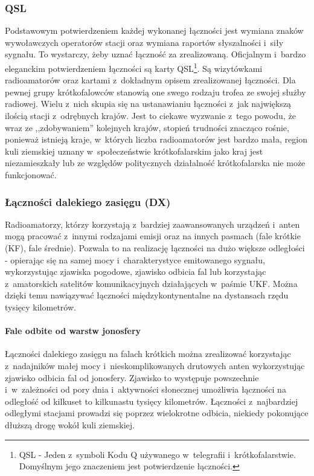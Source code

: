 \documentclass[eng,oneside]{mgr}
\begin{document}
				\subsubsection{QSL}
				Podstawowym potwierdzeniem każdej wykonanej łączności jest wymiana znaków wywoławczych operatorów stacji oraz wymiana raportów słyszalności i~siły sygnału. To wystarczy, żeby uznać łączność za zrealizowaną. Oficjalnym i~bardzo eleganckim potwierdzeniem łączności są karty QSL\footnote{QSL - Jeden z~symboli Kodu Q używanego w~telegrafii i~krótkofalarstwie. Domyślnym jego znaczeniem jest potwierdzenie łączności.}. Są wizytówkami radioamatorów oraz kartami z~dokładnym opisem zrealizowanej łączności. Dla pewnej grupy krótkofalowców stanowią one swego rodzaju trofea ze swojej służby radiowej. Wielu z~nich skupia się na ustanawianiu łączności z~jak największą ilością stacji z~odrębnych krajów. Jest to ciekawe wyzwanie z~tego powodu, że wraz ze ,,zdobywaniem'' kolejnych krajów, stopień trudności znacząco rośnie, ponieważ istnieją kraje, w~których liczba radioamatorów jest bardzo mała, region kuli ziemskiej uznany w~społeczeństwie krótkofalarskim jako kraj jest niezamieszkały lub ze względów politycznych działalność krótkofalarska nie może funkcjonować.

				\subsubsection{Łączności dalekiego zasięgu (DX)}
				Radioamatorzy, którzy korzystają z~bardziej zaawansowanych urządzeń i~anten mogą pracować z~innymi rodzajami emisji oraz na innych pasmach (fale krótkie (KF), fale średnie). Pozwala to na realizację łączności na dużo większe odległości - opierając się na samej mocy i~charakterystyce emitowanego sygnału, wykorzystując zjawiska pogodowe, zjawisko odbicia fal lub korzystając z~amatorskich satelitów komunikacyjnych działających w~paśmie UKF. Można dzięki temu nawiązywać łączności międzykontynentalne na dystansach rzędu tysięcy kilometrów.
					
					\paragraph{Fale odbite od warstw jonosfery}
					Łączności dalekiego zasięgu na falach krótkich można zrealizować korzystając z~nadajników małej mocy i~nieskomplikowanych drutowych anten wykorzystując zjawisko odbicia fal od jonosfery. Zjawisko to występuje powszechnie i~w~zależności od pory dnia i~aktywności słonecznej umożliwia łączności na odległość od kilkuset to kilkunastu tysięcy kilometrów. Łączności z~najbardziej odległymi stacjami prowadzi się poprzez wielokrotne odbicia, niekiedy pokonujące dłuższą drogę wokół kuli ziemskiej.
\end{document}
